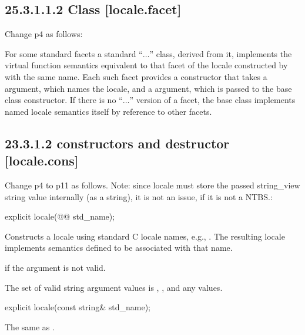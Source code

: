 \documentclass[ebook,11pt,article]{memoir}
\begin{document}
\subsection{25.3.1.1.2 Class  [locale.facet]}
Change p4 as follows:

\pnum
For some standard facets a standard
``$\ldots$''
class, derived from it, implements the virtual function semantics
equivalent to that facet of the locale constructed by
with the same name.
Each such facet provides a constructor that takes a
argument, which names the locale, and a 
argument, which is passed to the base class constructor.
If there is no
``$\ldots$''
version of a facet, the base class implements named locale
semantics itself by reference to other facets.

\subsection{23.3.1.2  constructors and destructor [locale.cons]}
Change p4 to p11 as follows. Note: since locale must store the passed string_view string value internally (as a string), it is not an issue, if it is not a NTBS.:

\begin{itemdecl}
explicit locale(@@ std_name);
\end{itemdecl}

\begin{itemdescr}
\pnum
\effects
Constructs a locale using standard C locale names, e.g., .
The resulting locale implements semantics defined to be associated
with that name.

\pnum
\throws
{}
if the argument is not valid.

\pnum
\remarks
The set of valid string argument values is , ,
and any  values.
\end{itemdescr}

\begin{removedblock}
\begin{itemdecl}
explicit locale(const string& std_name);
\end{itemdecl}

\begin{itemdescr}
\pnum
\effects The same as .
\end{itemdescr}
\end{removedblock}
\end{document}
